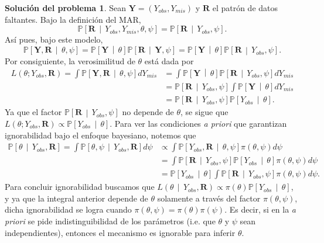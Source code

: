 \documentclass[twoside,12pt]{article}
\theoremstyle{definition}
\newtheorem{soln}{Solución del problema}
\newcommand{\YY}{\boldsymbol{Y}}
\newcommand{\probability}[1]{\mathbb{P}\left[#1\right]}
\newcommand{\given}{\,\middle|\,}
\begin{document}
\newpage
\begin{soln}
Sean $\YY = (Y_{obs}, Y_{mis})$ y $\boldsymbol{R}$ el patrón de datos faltantes. Bajo la definición del MAR,
\[
\probability{\boldsymbol{R} \given Y_{obs}, Y_{mis}, \theta, \psi} = \probability{\boldsymbol{R} \given Y_{obs}, \psi}.
\]
Así pues, bajo este modelo,
\[
\probability{\YY, \boldsymbol{R} \given \theta, \psi} = \probability{\YY \given \theta} \probability{\boldsymbol{R} \given \YY, \psi} =  \probability{\YY \given \theta} \probability{\boldsymbol{R} \given Y_{obs}, \psi}.
\]
Por consiguiente, la verosimilitud de $\theta$ está dada por
\[
\begin{split}
  L\left(\theta; Y_{obs}, \boldsymbol{R}\right) = \int \probability{\YY, \boldsymbol{R} \given \theta, \psi} dY_{mis} &= \int \probability{\YY \given \theta} \probability{\boldsymbol{R} \given Y_{obs}, \psi} dY_{mis}\\
  &= \probability{\boldsymbol{R} \given Y_{obs}, \psi} \int \probability{\YY \given \theta} dY_{mis}\\
  &= \probability{\boldsymbol{R} \given Y_{obs}, \psi} \probability{Y_{obs} \given \theta}.
\end{split}
\]
Ya que el factor $\probability{\boldsymbol{R} \given Y_{obs}, \psi}$ no depende de $\theta$, se sigue que $L\left(\theta; Y_{obs}, \boldsymbol{R}\right) \propto \probability{Y_{obs} \given \theta}$. Para ver las condiciones \textit{a priori} que garantizan ignorabilidad bajo el enfoque bayesiano, notemos que
\[
\begin{split}
  \probability{\theta \given Y_{obs}, \boldsymbol{R}} = \int \probability{\theta, \psi \given Y_{obs}, \boldsymbol{R}} d\psi &\propto \int \probability{Y_{obs}, \boldsymbol{R} \given \theta, \psi} \pi\left(\theta, \psi\right) d\psi\\
  &= \int \probability{\boldsymbol{R} \given Y_{obs}, \psi} \probability{Y_{obs} \given \theta} \pi\left(\theta, \psi\right) d\psi\\
  &= \probability{Y_{obs} \given \theta} \int \probability{\boldsymbol{R} \given Y_{obs}, \psi} \pi\left(\theta, \psi\right) d\psi.
\end{split}
\]
Para concluir ignorabilidad buscamos que $L\left(\theta \given Y_{obs}, \boldsymbol{R}\right) \propto \pi(\theta) \probability{Y_{obs} \given \theta}$, y ya que la integral anterior depende de $\theta$ solamente a través del factor $\pi\left(\theta, \psi\right)$, dicha ignorabilidad se logra cuando $\pi(\theta, \psi)=\pi(\theta)\pi(\psi)$. Es decir, si en la \textit{a priori} se pide indistinguibilidad de los parámetros (i.e. que $\theta$ y $\psi$ sean independientes), entonces el mecanismo es ignorable para inferir $\theta$.
\end{soln}
\end{document}
